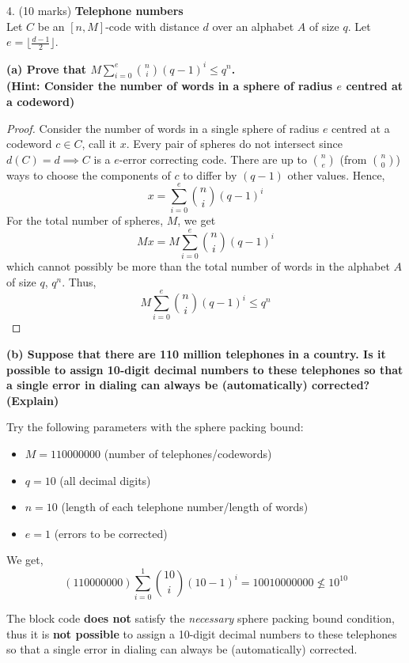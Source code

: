 



4. (10 marks) \textbf{Telephone numbers}\\
Let $C$ be an $[n,M]$-code with distance $d$ over an alphabet $A$
of size $q$. Let $e = \lfloor \frac{d-1}{2} \rfloor$.

\textbf{(a) Prove that $M \sum_{i=0}^e {n \choose i} (q-1)^i \leq q^n$.\\
     (Hint: Consider the number of words in a sphere of radius $e$ centred
      at a codeword)}
\begin{proof}
    Consider the number of words in a single sphere of radius $ e $ centred
    at a codeword $ c\in C $, call it $ x $. Every pair of spheres do not intersect
    since $ d(C)=d\implies C $ is a $ e $-error correcting code. There are up to
    $ \binom{n}{e} $ (from $ \binom{n}{0} $) ways
    to choose the components of $ c $ to differ by $ (q-1) $ other values.
    Hence,
    \[ x=\sum\limits_{i=0}^{e} \binom{n}{i}(q-1)^i \]
    For the total number of spheres, $ M $, we get
    \[ M x = M \sum\limits_{i=0}^{e} \binom{n}{i}(q-1)^i \]
    which cannot possibly be more than the total number of words in the alphabet
    $ A $ of size $ q $, $ q^n $. Thus,
    \[ M \sum\limits_{i=0}^e {n \choose i} (q-1)^i \leq q^n \]
\end{proof}

\textbf{(b) Suppose that there are 110 million telephones in a country.
      Is it possible to assign 10-digit decimal numbers to these
      telephones so that a single error in dialing can always be
      (automatically) corrected? (Explain)}

      Try the following parameters with the sphere packing bound:
      \begin{itemize}
        \item $ M=110000000 $ (number of telephones/codewords)
        \item $ q=10 $ (all decimal digits)
        \item $ n=10 $ (length of each telephone number/length of words)
        \item $ e=1 $ (errors to be corrected)
      \end{itemize}
      We get,
      \[ (110000000)\sum\limits_{i=0}^1 {10 \choose i} (10-1)^i
        =10010000000
        \nleq 10^{10} \]

        The block code \textbf{does not} satisfy the \emph{necessary}
        sphere packing bound condition, thus it is \textbf{not possible} to assign a
        10-digit decimal numbers to these telephones so that a single error
        in dialing can always be (automatically) corrected.

